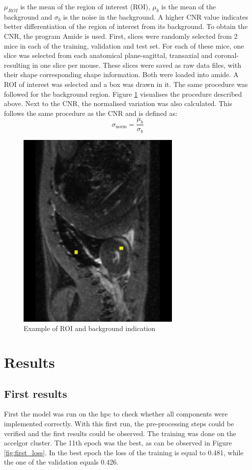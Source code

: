 \documentclass[twocolumn]{article}
\begin{document}
$\mu_{ROI}$ is the mean of the region of interest (ROI), $\mu_b$ is the mean of the background and $\sigma_b$ is the noise in the background.
A higher CNR value indicates better differentiation of the region of interest from its background.
To obtain the CNR, the program Amide is used. First, slices were randomly selected from 2 mice in each of the training, validation and test set. For each of these mice, one slice was selected from each anatomical plane-sagittal, transaxial and coronal- resulting in one slice per mouse.
These slices were saved as raw data files, with their shape corresponding shape information. Both were loaded into amide. A ROI of interest was selected and a box was drawn in it. The same procedure was followed for the background region.
Figure \ref{fig:CNR} visualises the procedure described above. 
Next to the CNR, the normalised variation was also calculated. This follows the same procedure as the CNR and is defined as:
\begin{equation}\label{eq:normsigma}
\sigma_{\text{norm}} = \frac{\mu_b}{\sigma_b}
\end{equation}

\begin{figure}
    \centering
    \includegraphics[width=0.35\linewidth]{CNR.jpeg}
    \caption{Example of ROI and background indication}
    \label{fig:CNR}
\end{figure}

\section{Results}
\subsection{First results}
First the model was run on the hpc to check whether all components were implemented correctly. 
With this first run, the pre-processing steps could be verified and the first results could be observed. 
The training was done on the accelgor cluster. 
The 11th epoch was the best, as can be observed in Figure \ref{fig:first_loss}.
In the best epoch the loss of the training is equal to 0.481, while the one of the validation equals 0.426.
\end{document}
